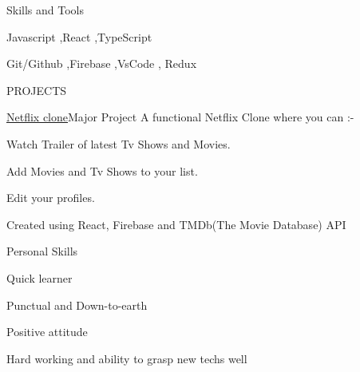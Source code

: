 \documentclass{resume} %
\begin{document}


\begin{rSection}{Skills and Tools}
\item Javascript ,React ,TypeScript 
\item Git/Github ,Firebase ,VsCode , Redux



\end{rSection}


\begin{rSection}{PROJECTS}

\begin{rSubsection}{\href{https://netflix-clone-theta-seven.vercel.app/}{Netflix clone}}{Major Project}{
A functional Netflix Clone where you can :-
}{}

\item Watch Trailer of latest Tv Shows and Movies.
\item Add Movies and Tv Shows to your list.
\item Edit your profiles.
\item Created using React, Firebase and TMDb(The Movie Database) API

 
\end{rSubsection} 

\end{rSection} 


\begin{rSection}{Personal Skills} \itemsep -3pt  
\item Quick learner 
\item Punctual and Down-to-earth
\item Positive attitude
\item Hard working and ability to grasp new techs well

\end{rSection} 
\end{document}
